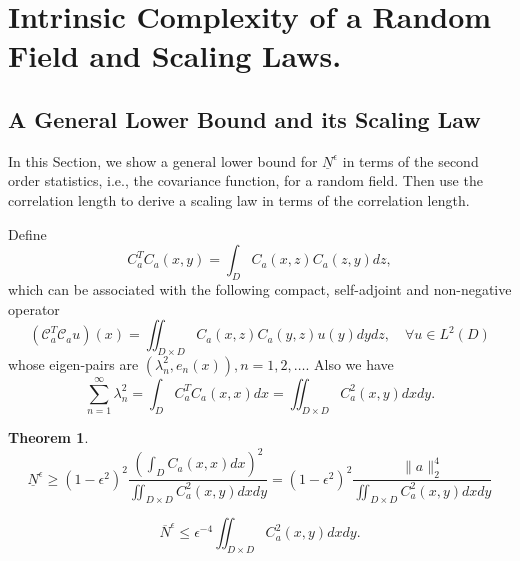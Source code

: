 \documentclass[11pt]{amsart}
\newtheorem{theorem}{Theorem}[section]
\newcommand{\cC}{\mathcal{C}}
\begin{document}
\section{Intrinsic Complexity of a Random Field and Scaling Laws.}
\label{sec:RF}
\subsection{A General Lower Bound and its Scaling Law}
In this Section, we show a general lower bound for $\underline{N}^{\epsilon}$ in terms of the second order statistics, i.e., the covariance function, for a random field. Then use the correlation length to derive a scaling law in terms of the correlation length. 

Define 
\begin{equation}
\label{eq:square}
C_a^T C_a(x,y)=\int_D C_a(x,z) C_a(z,y) dz, 
\end{equation}
which can be associated with the following compact, self-adjoint and non-negative operator
\begin{equation}
( \cC_a^T\cC_a u)(x)= \iint_{D\times D} C_a(x,z) C_a(y,z) u(y) dydz, \quad \forall u\in L^2(D)
\end{equation}
whose eigen-pairs are $(\lambda_n^2, e_n(x)), n=1, 2, \ldots$. Also we have
\begin{equation}
\sum_{n=1}^{\infty}\lambda_n^2=\int_D C_a^T C_a(x,x)dx=\iint_{D\times D} C_a^2(x,y)dxdy.
\end{equation}

\begin{theorem}
\label{th:lb}
\begin{equation}
\label{eq:lb}
 \underline{N}^{\epsilon} \ge (1-\epsilon^2)^2\frac{\left(\int_D C_a(x,x) dx\right)^2}{\iint_{D\times D} C_a^2(x,y)dxdy} =(1-\epsilon^2)^2\frac{\|a\|_2^4}{\iint_{D\times D} C_a^2(x,y)dxdy}
\end{equation}

\begin{equation}
\overline{N}^{\epsilon}\le \epsilon^{-4}\iint_{D\times D} C_a^2(x,y)dxdy.
\end{equation}

\end{theorem}
\end{document}
